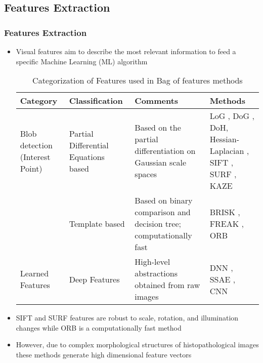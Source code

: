 \documentclass [9pt,times] {beamer}
\begin{document}
\subsection*{Features Extraction}\label{ Features Extraction}
\begin{frame}\frametitle{Features Extraction}
\justifying
\fontsize{9pt}{11pt}\selectfont
\begin{itemize}
	\item Visual features aim to describe the most relevant information
	to feed a specific Machine Learning (ML) algorithm 

\begin{block}{}
\begin{table}[!t]
\renewcommand{\arraystretch}{1.5}
\caption{Categorization of Features used in Bag of features methods \cite{li2015}}
\label{Tab:features}
\centering
\scriptsize{
\begin{tabular}{p{1.5cm}|p{1.6cm}|p{2.5cm}|p{3.2cm}}
	 \hline
	\textbf{Category}  & \textbf{Classification} &  \textbf{Comments} & \textbf{Methods}\\
	 \hline 
	Blob detection (Interest Point) &  Partial Differential Equations based & Based on the partial
differentiation on Gaussian scale spaces & LoG \cite{o2011}, DoG \cite{raza2011}, DoH, Hessian-Laplacian \cite{orting2018}, SIFT \cite{cruz2011, galaro2011}, SURF \cite{raza2011, spanhol2016}, KAZE \cite{sanchez2018k}\\

 & Template based & Based on binary comparison and decision tree; computationally fast & BRISK \cite{li2016f}, FREAK \cite{nei2017}, ORB \cite{spanhol2016}\\

\hline
Learned Features & Deep Features &  High-level abstractions obtained from raw images &DNN \cite{cirecsan2013, bar2015}, SSAE \cite{xu2014}, CNN \cite{cruz2013} \\

\hline

\end{tabular}
}
\end{table}
\end{block}


\item SIFT and SURF features are robust to scale, rotation, and illumination changes while ORB is a computationally fast method \cite{bay2008}

\item However, due to complex morphological structures of histopathological images these methods generate high dimensional feature vectors


\end{itemize}

\end{frame}
\end{document}
